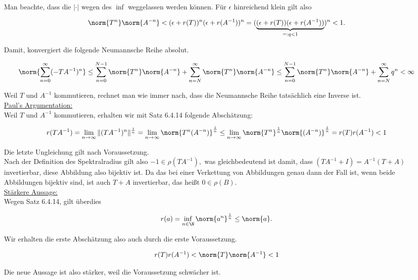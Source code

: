 \begin{solution}
Man beachte, dass die $|\cdot|$ wegen des $\inf$ weggelassen werden können.
Für $\epsilon$ hinreichend klein gilt also

\begin{align*}
  \norm{T^n} \norm{A^{-n}}
  <
  (\epsilon + r(T))^n
  (\epsilon + r(A^{-1}))^n
  =
  (
    \underbrace
    {
      (\epsilon + r(T))
      (\epsilon + r(A^{-1}))
    }_{=: q < 1}
  )^n < 1.
\end{align*}

Damit, konvergiert die folgende Neumannsche Reihe absolut.

\begin{align*}
  \norm{\sum_{n = 0}^\infty (-T A^{-1})^n}
  \leq
  \sum_{n = 0}^{N-1} \norm{T^n} \norm{A^{-n}} +
  \sum_{n = N}^\infty \norm{T^n} \norm{A^{-n}}
  \leq
  \sum_{n = 0}^{N-1} \norm{T^n} \norm{A^{-n}} +
  \sum_{n = N}^\infty q^n
  < \infty
\end{align*}

Weil $T$ und $A^{-1}$ kommutieren, rechnet man wie immer nach, dass die Neumannsche Reihe tatsächlich eine Inverse ist. \\

\underline{Paul's Argumentation:} \\

Weil $T$ und $A^{-1}$ kommutieren, erhalten wir mit Satz 6.4.14 folgende Abschätzung:

\begin{align*}
    r(TA^{-1})
    =
    \lim_{n \to \infty}{\|(TA^{-1})^n\|^{\frac{1}{n}}}
    =
    \lim_{n \to \infty}
    \norm{T^n(A^{-n})}^\frac{1}{n}
    \leq
    \lim_{n \to \infty}
    \norm{T^n}^\frac{1}{n}
    \norm{(A^{-n})}^\frac{1}{n}
    =
    r(T) r(A^{-1}) < 1
\end{align*}

Die letzte Ungleichung gilt nach Voraussetzung. \\

Nach der Definition des Spektralradius gilt also $-1 \in \rho(TA^{-1}),$ was gleichbedeutend ist damit, dass $(TA^{-1} + I) = A^{-1} (T + A)$ invertierbar, diese Abbildung also bijektiv ist. Da das bei einer Verkettung von Abbildungen genau dann der Fall ist, wenn beide Abbildungen bijektiv sind, ist auch $T + A$ invertierbar, das heißt $0 \in \rho(B).$ \\

\underline{Stärkere Aussage:} \\

Wegen Satz 6.4.14, gilt überdies

\begin{align*}
  r(a)
  =
  \inf_{n \in \N}
  \norm{a^n}^\frac{1}{n}
  \leq
  \norm{a}.
\end{align*}

Wir erhalten die erste Abschätzung also auch durch die erste Voraussetzung.

\begin{align*}
  r(T) r(A^{-1})
  <
  \norm{T} \norm{A^{-1}} < 1
\end{align*}

Die neue Aussage ist also stärker, weil die Voraussetzung schwächer ist.

\end{solution}
